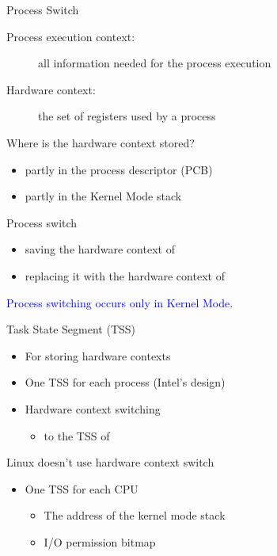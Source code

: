 \begin{frame}{Process Switch}
  \begin{description}
  \item[Process execution context:] all information needed for the process execution
  \item[Hardware context:] the set of registers used by a process
  \end{description}
  \begin{block}{Where is the hardware context stored?}
    \begin{itemize}
    \item partly in the process descriptor (PCB)
    \item partly in the Kernel Mode stack
    \end{itemize}
  \end{block}
  \begin{block}{Process switch}
    \begin{itemize}
    \item saving the hardware context of {}
    \item replacing it with the hardware context of {}
    \end{itemize}
  \end{block}
  \textcolor{blue}{Process switching occurs only in Kernel Mode.}
\end{frame}

\begin{frame}
  \begin{block}{Task State Segment (TSS)}
    \begin{itemize}
    \item For storing hardware contexts
    \item One TSS for each process (Intel's design)
    \item Hardware context switching
      \begin{itemize}
      \item {} to the TSS of {}
      \end{itemize}
    \end{itemize}
  \end{block}
  \begin{block}{Linux doesn't use hardware context switch}
    \begin{itemize}
    \item One TSS for each CPU
      \begin{itemize}
      \item The address of the kernel mode stack
      \item I/O permission bitmap
      \end{itemize}
    \end{itemize}
  \end{block}
\end{frame}

